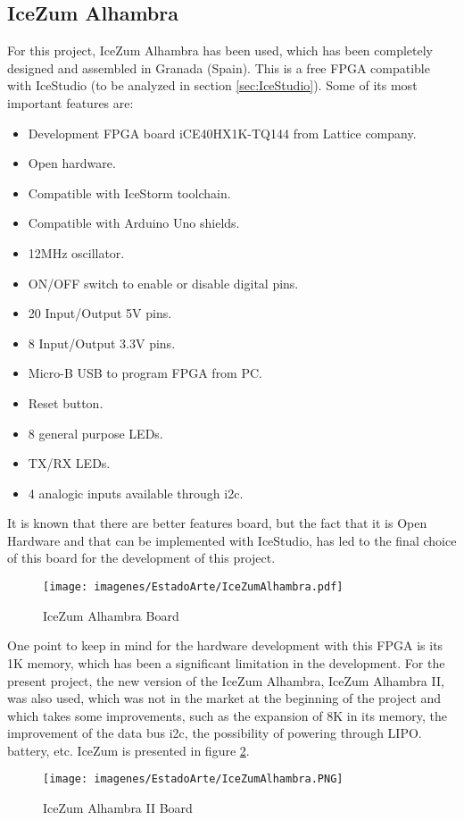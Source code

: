 \subsection{IceZum Alhambra}
For this project, IceZum Alhambra\cite{Alhambra} has been used, which has been completely designed and assembled in Granada (Spain).\newline
This is a free FPGA compatible with IceStudio (to be analyzed in section \ref{sec:IceStudio}). Some of its most important features are:
\begin{itemize}
	\item Development FPGA board iCE40HX1K-TQ144 from Lattice company. 
	\item Open hardware.
	\item Compatible with IceStorm toolchain.
	\item Compatible with Arduino Uno shields. 
	\item 12MHz oscillator.
	\item ON/OFF switch to enable or disable digital pins.
	\item 20 Input/Output 5V pins.
	\item 8 Input/Output 3.3V pins.
	\item Micro-B USB to program FPGA from PC.
	\item Reset button.
	\item 8 general purpose LEDs.
	\item TX/RX LEDs.
	\item 4 analogic inputs available through i2c.
\end{itemize}

It is known that there are better features board, but the fact that it is Open Hardware and that can be implemented with IceStudio, has led to the final choice of this board for the development of this project.\newline
\begin{center}
\begin{figure}[H]
	\center
	\texttt{[image: imagenes/EstadoArte/IceZumAlhambra.pdf]}
	\caption{IceZum Alhambra Board}
	\label{fig:IceZumAlhambraI}
\end{figure} 
\end{center}
One point to keep in mind for the hardware development with this FPGA is its 1K memory, which has been a significant limitation in the development. For the present project, the new version of the IceZum Alhambra, IceZum Alhambra II, was also used, which was not in the market at the beginning of the project and which takes some improvements, such as the expansion of 8K in its memory, the improvement of the data bus i2c, the possibility of powering through LIPO. battery, etc. IceZum is presented in figure \ref{fig: IceZumAlhambraII}.
\begin{center}
	\begin{figure}[H]
		\center
		\texttt{[image: imagenes/EstadoArte/IceZumAlhambra.PNG]}
		\caption{IceZum Alhambra II Board}
		\label{fig: IceZumAlhambraII}
	\end{figure} 
\end{center}


